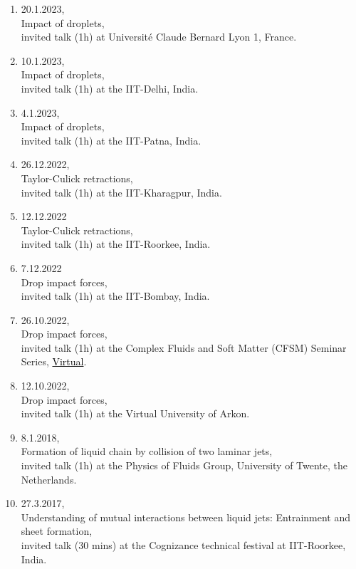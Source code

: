 \documentclass[10pt,a4paper,colorlinks,linkcolor=blue,urlcolor=blue,citecolor=blue]{moderncv}
\begin{document}
\begin{enumerate}[leftmargin=0.75cm]
	\item 20.1.2023,\\
	Impact of droplets,\\
	invited talk (1h) at Universit\'e Claude Bernard Lyon 1, France.

	\item 10.1.2023,\\
	Impact of droplets,\\
	invited talk (1h) at the IIT-Delhi, India.

	\item 4.1.2023,\\
	Impact of droplets,\\
	invited talk (1h) at the IIT-Patna, India.

	\item 26.12.2022,\\
	Taylor-Culick retractions,\\
	invited talk (1h) at the IIT-Kharagpur, India.


	\item 12.12.2022\\
	Taylor-Culick retractions,\\
	invited talk (1h) at the IIT-Roorkee, India.

	\item 7.12.2022\\
	Drop impact forces,\\
	invited talk (1h) at the IIT-Bombay, India.

	\item 26.10.2022,\\
	Drop impact forces,\\
	invited talk (1h) at the Complex Fluids and Soft Matter (CFSM) Seminar Series, \href{https://youtu.be/enTMAucwUDs}{\textcolor{black}{Virtual}}.

	\item 12.10.2022,\\
	Drop impact forces,\\
	invited talk (1h) at the Virtual University of Arkon.

	\item 8.1.2018,\\
	Formation of liquid chain by collision of two laminar jets,\\
	invited talk (1h) at the Physics of Fluids Group, University of Twente, the Netherlands.

	\item 27.3.2017,\\
	Understanding of mutual interactions between liquid jets: Entrainment and sheet formation,\\
	invited talk (30 mins) at the Cognizance technical festival at IIT-Roorkee, India.
\end{enumerate}
\end{document}
